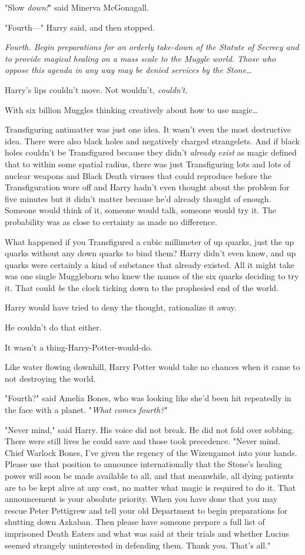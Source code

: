 "Slow \emph{down!}" said Minerva McGonagall.

"Fourth---" Harry said, and then stopped.

\emph{Fourth. Begin preparations for an orderly take-down of the Statute of
Secrecy and to provide magical healing on a mass scale to the Muggle world.
Those who oppose this agenda in any way may be denied services by the
Stone{\ldots}}

Harry's lips couldn't move. Not wouldn't, \emph{couldn't.}

With six billion Muggles thinking creatively about how to use magic{\ldots}

Transfiguring antimatter was just one idea. It wasn't even the most destructive
idea. There were also black holes and negatively charged strangelets. And if
black holes couldn't be Transfigured because they didn't \emph{already exist}
as magic defined that to within some spatial radius, there was just
Transfiguring lots and lots of nuclear weapons and Black Death viruses that
could reproduce before the Transfiguration wore off and Harry hadn't even
thought about the problem for five minutes but it didn't matter because he'd
already thought of enough. Someone would think of it, someone would talk,
someone would try it. The probability was as close to certainty as made no
difference.

What happened if you Transfigured a cubic millimeter of up quarks, just the up
quarks without any down quarks to bind them? Harry didn't even know, and up
quarks were certainly a kind of substance that already existed. All it might
take was one single Muggleborn who knew the names of the six quarks deciding to
try it. That could \emph{be} the clock ticking down to the prophesied end of
the world.

Harry would have tried to deny the thought, rationalize it away.

He couldn't do that either.

It wasn't a thing-Harry-Potter-would-do.

Like water flowing downhill, Harry Potter would take no chances when it came to
not destroying the world.

"Fourth?" said Amelia Bones, who was looking like she'd been hit repeatedly in
the face with a planet. "\emph{What comes fourth?}"

"Never mind," said Harry. His voice did not break. He did not fold over
sobbing. There were still lives he could save and those took precedence. "Never
mind. Chief Warlock Bones, I've given the regency of the Wizengamot into your
hands. Please use that position to announce internationally that the Stone's
healing power will soon be made available to all, and that meanwhile, all dying
patients are to be kept alive at any cost, no matter what magic is required to
do it. That announcement is your absolute priority. When you have done that you
may rescue Peter Pettigrew and tell your old Department to begin preparations
for shutting down Azkaban. Then please have someone prepare a full list of
imprisoned Death Eaters and what was said at their trials and whether Lucius
seemed strangely uninterested in defending them. Thank you. That's all."

